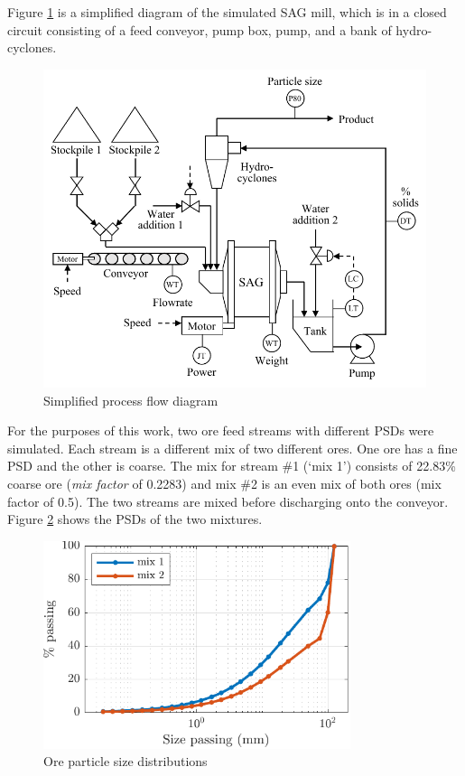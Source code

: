 {{Figure \ref{fig:sag-diag} is a simplified diagram of the simulated \acrshort{SAG} mill, which is in a closed circuit consisting of a feed conveyor, pump box, pump, and a bank of hydro-cyclones.
\begin{figure}[ht]
	\centering
	\includegraphics[width=12.5cm]{images/sag-circuit-diag.pdf}
	\caption{Simplified process flow diagram}
	\label{fig:sag-diag}
\end{figure}
For the purposes of this work, two ore feed streams with different \gls{PSD}s were simulated. Each stream is a different mix of two different ores. One ore has a fine \gls{PSD} and the other is coarse. The mix for stream \#1 (`mix 1') consists of 22.83\% coarse ore (\textit{mix factor} of 0.2283) and mix \#2 is an even mix of both ores (mix factor of 0.5). The two streams are mixed before discharging onto the conveyor. Figure \ref{fig:coarse_fine_psd_plot} shows the \gls{PSD}s of the two mixtures.
\begin{figure}[ht]
	\centering
	\includegraphics[width=9cm]{images/coarse_fine_cumpsd_plot.pdf}
	\caption{Ore particle size distributions}
	\label{fig:coarse_fine_psd_plot}
\end{figure}

}}
